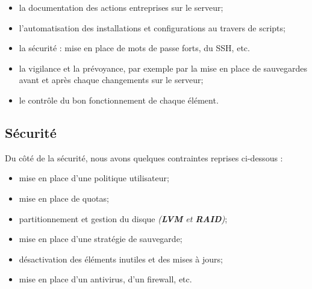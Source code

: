 \begin{itemize}
    \item la documentation des actions entreprises sur le serveur;
    \item l'automatisation des installations et configurations au travers de scripts;
    \item la sécurité : mise en place de mots de passe forts, du SSH, etc.
    \item la vigilance et la prévoyance, par exemple par la mise en place de
    sauvegardes avant et après chaque changements sur le serveur;
    \item le contrôle du bon fonctionnement de chaque élément.
\end{itemize}


\subsection{Sécurité}
\label{sec:securite}

Du côté de la sécurité, nous avons quelques contraintes reprises ci-dessous :

\begin{itemize}
    \item mise en place d'une politique utilisateur;
    \item mise en place de quotas;
    \item partitionnement et gestion du disque \textit{(\textbf{LVM} et
    \textbf{RAID})};
    \item mise en place d'une stratégie de sauvegarde;
    \item désactivation des éléments inutiles et des mises à jours;
    \item mise en place d'un antivirus, d'un firewall, etc.
\end{itemize}

